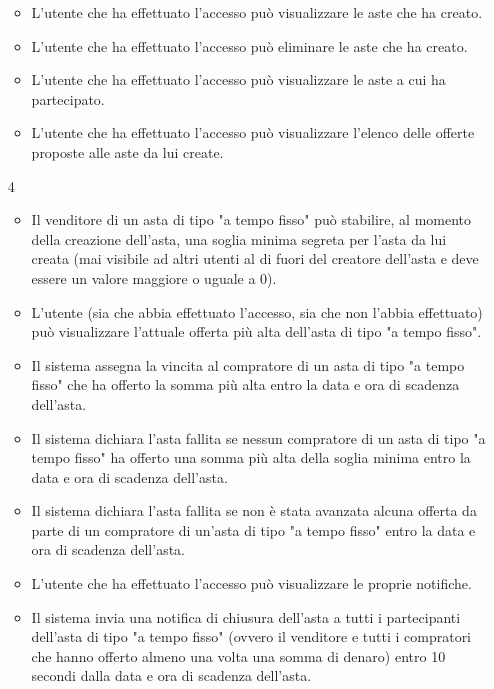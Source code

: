 \begin{itemize}
\begin{itemize}
                    \item L'utente che ha effettuato l'accesso può visualizzare le aste che ha creato.
                    \item L'utente che ha effettuato l'accesso può eliminare le aste che ha creato.
                    \item L'utente che ha effettuato l'accesso può visualizzare le aste a cui ha partecipato.
                    \item L'utente che ha effettuato l'accesso può visualizzare l'elenco delle offerte proposte alle aste da lui create.
                \end{itemize}
            \item[4]
                \begin{itemize}
                    \item Il venditore di un asta di tipo "a tempo fisso" può stabilire, al momento della creazione dell'asta, una soglia minima segreta per l'asta da lui creata (mai visibile ad altri utenti al di fuori del creatore dell'asta e deve essere un valore maggiore o uguale a 0).
                    \item L'utente (sia che abbia effettuato l'accesso, sia che non l'abbia effettuato) può visualizzare l'attuale offerta più alta dell'asta di tipo "a tempo fisso".
                    \item Il sistema assegna la vincita al compratore di un asta di tipo "a tempo fisso" che ha offerto la somma più alta entro la data e ora di scadenza dell'asta.
                    \item Il sistema dichiara l'asta fallita se nessun compratore di un asta di tipo "a tempo fisso" ha offerto una somma più alta della soglia minima entro la data e ora di scadenza dell'asta.
                    \item Il sistema dichiara l'asta fallita se non è stata avanzata alcuna offerta da parte di un compratore di un'asta di tipo "a tempo fisso" entro la data e ora di scadenza dell'asta.
                    \item L'utente che ha effettuato l'accesso può visualizzare le proprie notifiche.
                    \item Il sistema invia una notifica di chiusura dell'asta a tutti i partecipanti dell'asta di tipo "a tempo fisso" (ovvero il venditore e tutti i compratori che hanno offerto almeno una volta una somma di denaro) entro 10 secondi dalla data e ora di scadenza dell'asta.
                \end{itemize}

\end{itemize}
